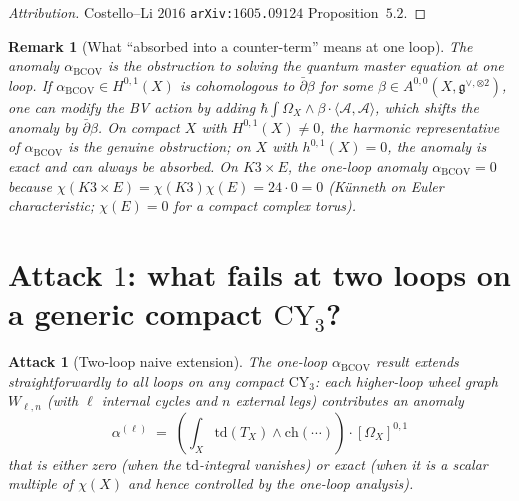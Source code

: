 \documentclass[11pt]{article}
\newtheorem{remark}[theorem]{Remark}
\newtheorem{attack}[theorem]{Attack}
\providecommand{\CY}{\mathrm{CY}}
\providecommand{\BCOV}{\mathrm{BCOV}}
\providecommand{\Om}{\Omega}
\providecommand{\cA}{\mathcal{A}}
\providecommand{\fg}{\mathfrak{g}}
\begin{document}
\begin{proof}[Attribution]
Costello--Li $2016$ \texttt{arXiv:$1605$.$09124$} Proposition~$5.2$.
\end{proof}

\begin{remark}[What ``absorbed into a counter-term'' means at one loop]
\label{rem:one-loop-counter-term}
The anomaly $\alpha_\BCOV$ is the obstruction to solving the
quantum master equation at one loop.  If $\alpha_\BCOV \in H^{0,1}(X)$
is cohomologous to $\bar\partial \beta$ for some $\beta \in A^{0,0}
(X, \fg^{\vee, \otimes 2})$, one can modify the BV action by adding
$\hbar \int \Om_X \wedge \beta \cdot \langle \cA, \cA\rangle$, which
shifts the anomaly by $\bar\partial \beta$.  On compact $X$ with
$H^{0,1}(X) \neq 0$, the harmonic representative of $\alpha_\BCOV$
is the genuine obstruction; on $X$ with $h^{0,1}(X) = 0$, the
anomaly is exact and can always be absorbed.  On $K3 \times E$,
the one-loop anomaly $\alpha_\BCOV = 0$ because $\chi(K3 \times E) =
\chi(K3)\chi(E) = 24 \cdot 0 = 0$ (Künneth on Euler characteristic;
$\chi(E) = 0$ for a compact complex torus).
\end{remark}

\section{Attack $1$: what fails at two loops on a generic compact
$\CY_3$?}
\label{sec:attack-1}

\begin{attack}[Two-loop naive extension]
\label{att:two-loop-naive}
The one-loop $\alpha_\BCOV$ result extends straightforwardly to all
loops on any compact $\CY_3$:  each higher-loop wheel graph $W_{\ell,n}$
(with $\ell$ internal cycles and $n$ external legs) contributes an
anomaly
\[
  \alpha^{(\ell)} \;=\; \left(\int_X \mathrm{td}(T_X) \wedge \mathrm{ch}(\cdots)\right)
    \cdot [\Om_X]^{0,1}
\]
that is either zero (when the $\mathrm{td}$-integral vanishes) or
exact (when it is a scalar multiple of $\chi(X)$ and hence
controlled by the one-loop analysis).
\end{attack}
\end{document}
